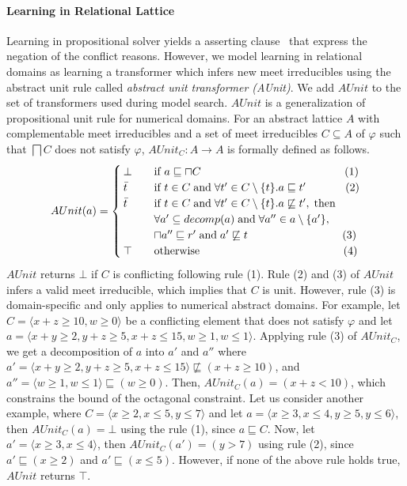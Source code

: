 \paragraph{\textbf{Learning in Relational Lattice}}
Learning in propositional solver yields a asserting clause~\cite{cdcl} 
that express the negation of the conflict reasons.  However, we model 
learning in relational domains as learning a transformer which infers 
new meet irreducibles using the abstract unit rule called 
{\em abstract unit transformer (AUnit)}.  We add $AUnit$ to the set of 
transformers  used during model search. $AUnit$ is 
a generalization of propositional unit rule for numerical domains.  For 
an abstract lattice $A$ with complementable meet irreducibles and a set 
of meet irreducibles $C \subseteq A$ of $\varphi$ such that $\bigsqcap C$ does not 
satisfy $\varphi$, $AUnit_C: A \rightarrow A$ is formally defined as follows. 
\[ AUnit(a) =
 \begin{cases}
  \bot       & \quad \text{if } a \sqsubseteq \sqcap{C} \qquad \qquad \qquad
  \qquad \qquad \qquad \quad (1)\\
  \bar{t}    & \quad \text{if } t \in C \; \text{and} \; \forall t' \in C
  \setminus \{t\}. a  \sqsubseteq t' \qquad \quad \; \; (2) \\
  \bar{t}    & \quad \text{if } t \in C \; \text{and} \; \forall t' \in C \setminus \{t\}. a
  \not\sqsubseteq t', \; \text{then} \\ 
             & \quad \forall a' \subseteq decomp(a) \;  \text{and} \; \forall a'' \in a \setminus \{a'\}, \\ 
             & \quad \sqcap{a''} \sqsubseteq r' \; \text{and} \; a'
             \not\sqsubseteq t   \qquad \qquad \qquad \qquad \; \; (3) \\
  \top & \quad \text{otherwise} \qquad \qquad \qquad \qquad \qquad \qquad \quad (4) \\
 \end{cases}
\]
$AUnit$ returns $\bot$ if $C$ is conflicting following rule (1).  Rule (2) and
(3) of $AUnit$ infers a valid meet irreducible, which implies that $C$ is unit. 
However, rule (3) is domain-specific and only applies to numerical abstract
domains.  For example, let $C = \langle x+z \geq 10,  w \geq 0 \rangle$ 
be a conflicting element that does not satisfy $\varphi$ and let $a= \langle x+y \geq 2, y+z \geq 5,
x+z \leq 15, w \geq 1, w \leq 1 \rangle$.  Applying rule (3) of $AUnit_C$, we get a 
decomposition of $a$ into $a'$ and $a''$ where 
$a'= \langle x+y \geq 2, y+z \geq 5, x+z \leq 15 \rangle \not\sqsubseteq (x+z \geq 10)$, and 
$a''= \langle w \geq 1, w \leq 1 \rangle \sqsubseteq (w \geq 0)$.  Then, $AUnit_C(a) = (x+z < 10)$, 
which constrains the bound of the octagonal constraint.  
Let us consider another example, where $C = \langle x \geq 2, x \leq 5, y \leq 7 \rangle$
and let $a = \langle x \geq 3, x \leq 4, y \geq 5, y \leq 6 \rangle$, then $AUnit_C(a) = \bot$ using
the rule (1), since $a \sqsubseteq C$.  Now, let $a' = \langle x \geq 3, x \leq 4 \rangle$, 
then $AUnit_C(a') = (y > 7)$ using rule (2), since $a' \sqsubseteq (x \geq 2)$
and $a' \sqsubseteq (x \leq 5)$.  However, if none of the above rule holds true, $AUnit$ 
returns $\top$. 
 
